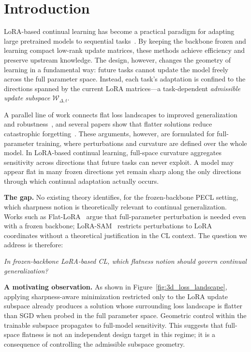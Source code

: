 \section{Introduction}
\label{sec:intro}

LoRA-based continual learning has become a practical paradigm for adapting large pretrained models to sequential tasks~\citep{hu2022lora,Wang_2022_CVPR,Gao_2023_ICCV}.
By keeping the backbone frozen and learning compact low-rank update matrices, these methods achieve efficiency and preserve upstream knowledge.
The design, however, changes the geometry of learning in a fundamental way: future tasks cannot update the model freely across the full parameter space.
Instead, each task's adaptation is confined to the directions spanned by the current LoRA matrices---a task-dependent \emph{admissible update subspace} $\mathcal{W}_{\Delta,t}$.

A parallel line of work connects flat loss landscapes to improved generalization and robustness~\citep{FlatMinima1997,foretSharpnessAwareMinimizationEfficiently2021,NEURIPS2021_995f5e03}, and several papers show that flatter solutions reduce catastrophic forgetting~\citep{NEURIPS2020_518a38cc,shiOvercomingCatastrophicForgetting2021}.
These arguments, however, are formulated for full-parameter training, where perturbations and curvature are defined over the whole model.
In LoRA-based continual learning, full-space curvature aggregates sensitivity across directions that future tasks can never exploit.
A model may appear flat in many frozen directions yet remain sharp along the only directions through which continual adaptation actually occurs.

\textbf{The gap.} No existing theory identifies, for the frozen-backbone PECL setting, which sharpness notion is theoretically relevant to continual generalization.
Works such as Flat-LoRA~\citep{li2024flatlora} argue that full-parameter perturbation is needed even with a frozen backbone; LoRA-SAM~\citep{NEURIPS2024_4eb2c0ad} restricts perturbations to LoRA coordinates without a theoretical justification in the CL context.
The question we address is therefore:

\begin{center}
\emph{In frozen-backbone LoRA-based CL, which flatness notion should govern continual generalization?}
\end{center}

\textbf{A motivating observation.}
As shown in Figure~\ref{fig:3d_loss_landscape}, applying sharpness-aware minimization restricted only to the LoRA update subspace already produces a solution whose surrounding loss landscape is flatter than SGD when probed in the full parameter space.
Geometric control within the trainable subspace propagates to full-model sensitivity.
This suggests that full-space flatness is not an independent design target in this regime; it is a consequence of controlling the admissible subspace geometry.

